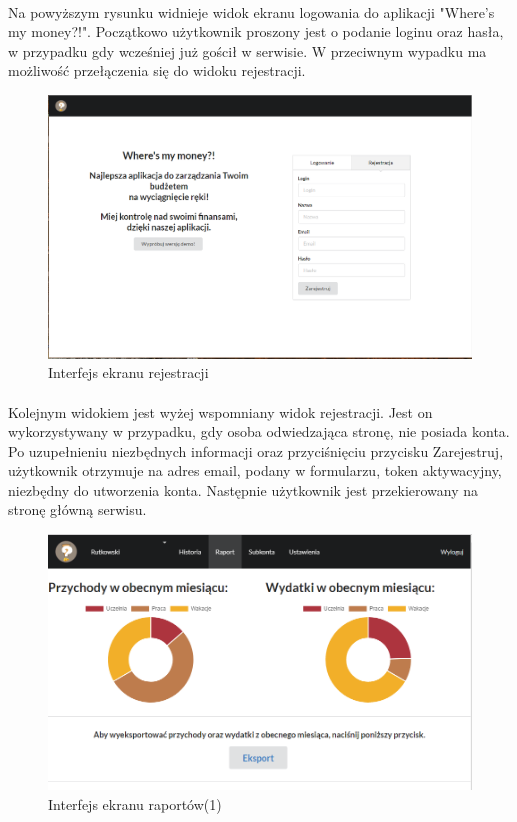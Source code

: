 \documentclass{article}
\begin{document}
	\paragraph*{} Na powyższym rysunku widnieje widok ekranu logowania do aplikacji "Where's my money?!". Początkowo użytkownik proszony jest o podanie loginu oraz hasła, w przypadku gdy wcześniej już gościł w serwisie. W przeciwnym wypadku ma możliwość przełączenia się do widoku rejestracji.
	\begin{figure}[H]
		\hspace*{-1cm}
		\includegraphics[scale=0.4]{assets/view2.png}
		\caption[]{Interfejs ekranu rejestracji}
		\label{fig:rejestr}
	\end{figure}
	\paragraph*{} Kolejnym widokiem jest wyżej wspomniany widok rejestracji. Jest on wykorzystywany w przypadku, gdy osoba odwiedzająca stronę, nie posiada konta. Po uzupełnieniu niezbędnych informacji oraz przyciśnięciu przycisku Zarejestruj, użytkownik otrzymuje na adres email, podany w formularzu, token aktywacyjny, niezbędny do utworzenia konta. Następnie użytkownik jest przekierowany na stronę główną serwisu.
\begin{figure}[H]
	\hspace*{-1cm}
	\includegraphics[scale=0.6]{assets/view3(1).png}
	\caption[]{Interfejs ekranu raportów(1)}
	\label{fig:raport1}
\end{figure}
\end{document}
